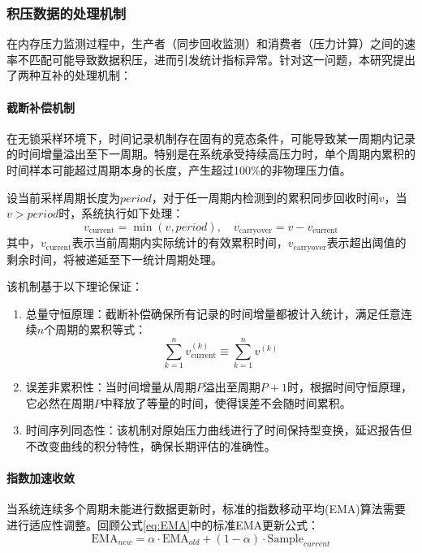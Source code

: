 \subsubsection{积压数据的处理机制}

在内存压力监测过程中，生产者（同步回收监测）和消费者（压力计算）之间的速率不匹配可能导致数据积压，进而引发统计指标异常。针对这一问题，本研究提出了两种互补的处理机制：

\paragraph{截断补偿机制} \quad 在无锁采样环境下，时间记录机制存在固有的竞态条件，可能导致某一周期内记录的时间增量溢出至下一周期。特别是在系统承受持续高压力时，单个周期内累积的时间样本可能超过周期本身的长度，产生超过100\%的非物理压力值。

设当前采样周期长度为\(\textit{period}\)，对于任一周期内检测到的累积同步回收时间\(v\)，当\(v > \textit{period}\)时，系统执行如下处理：
\begin{equation}
v_{\text{current}} = \min(v, \textit{period}), \quad v_{\text{carryover}} = v - v_{\text{current}}
\end{equation}
其中，\(v_{\text{current}}\)表示当前周期内实际统计的有效累积时间，\(v_{\text{carryover}}\)表示超出阈值的剩余时间，将被递延至下一统计周期处理。

该机制基于以下理论保证：
\begin{enumerate}
    \item 总量守恒原理：截断补偿确保所有记录的时间增量都被计入统计，满足任意连续\(n\)个周期的累积等式：
    \begin{equation}
        \sum_{k=1}^n v_{\text{current}}^{(k)} \equiv \sum_{k=1}^n v^{(k)}
    \end{equation}
    \item 误差非累积性：当时间增量从周期\(P\)溢出至周期\(P+1\)时，根据时间守恒原理，它必然在周期\(P\)中释放了等量的时间，使得误差不会随时间累积。
    \item 时间序列同态性：该机制对原始压力曲线进行了时间保持型变换，延迟报告但不改变曲线的积分特性，确保长期评估的准确性。
\end{enumerate}

\paragraph{指数加速收敛} \quad 当系统连续多个周期未能进行数据更新时，标准的指数移动平均(EMA)算法需要进行适应性调整。回顾公式\ref{eq:EMA}中的标准EMA更新公式：
\begin{equation}
    \text{EMA}_{new} = \alpha \cdot \text{EMA}_{old} + (1-\alpha) \cdot \text{Sample}_{current}
\end{equation}

